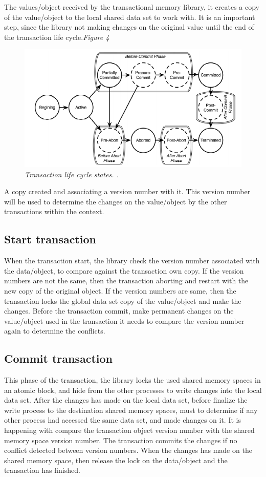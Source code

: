 \documentclass[12pt]{article}
\begin{document}
The values/object received by the transactional memory library, it creates a copy of the value/object to the local shared data set to work with. It is an important step, since the library not making changes on the original value until the end of the transaction life cycle.\textit{\color{gray}Figure 4}

\begin{figure}[h!]
\centering
\includegraphics[scale=0.4]{Pictures/transactionLifeCycle.png}
\caption{\textit{\color{gray}Transaction life cycle states. \cite{DLUATM}.}}
\end{figure}

A copy created and associating a version number with it. This version number will be used to determine the changes on the value/object by the other transactions within the context.

\subsection{Start transaction}
When the transaction start, the library check the version number associated with the data/object, to compare against the transaction own copy. If the version numbers are not the same, then the transaction aborting and restart with the new copy of the original object. If the version numbers are same, then the transaction locks the global data set copy of the value/object and make the changes. Before the transaction commit, make permanent changes on the value/object used in the transaction it needs to compare the version number again to determine the conflicts.   

\subsection{Commit transaction}
This phase of the transaction, the library locks the used shared memory spaces in an atomic block, and hide from the other processes to write changes into the local data set. After the changes has made on the local data set, before finalize the write process to the destination shared memory spaces, must to determine if any other process had accessed the same data set, and made changes on it. It is happening with compare the transaction object version number with the shared memory space version number. The transaction commits the changes if no conflict detected between version numbers. When the changes has made on the shared memory space, then release the lock on the data/object and the transaction has finished.\\ 
\end{document}
